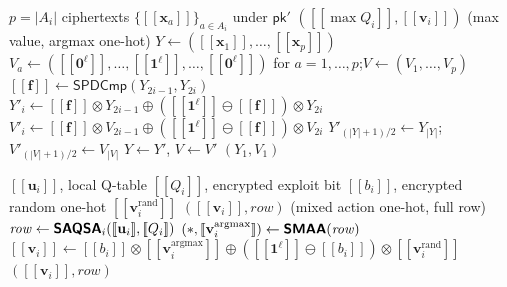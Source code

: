 \documentclass[letterpaper,10pt]{article}
\newcommand{\textbt}[1]{\textsf{\textbf{#1}}}
\theoremstyle{remark}
\newcommand{\impc}{\textsf{SPDCmp}\xspace}
\newcommand{\En}[1]{[\![#1]\!]}
\begin{document}
\begin{algorithm}[t]
\caption{\textbt{SMAA}: Secure Max and Argmax}
\label{alg:smaa}
\small
\begin{algorithmic}[1]
\Require $p=|A_i|$ ciphertexts $\{\En{\mathbf{x}_a}\}_{a\in A_i}$ under
$\mathsf{pk}'$
\Ensure $(\En{\max Q_i}, \En{\mathbf{v}_i})$ (max value, argmax one-hot)
\State $Y \leftarrow (\En{\mathbf{x}_1},\ldots,\En{\mathbf{x}_p})$
\State $V_a \leftarrow
(\En{\mathbf{0}^\ell},\ldots,\En{\mathbf{1}^\ell},\ldots,\En{\mathbf{0}^\ell})$
for $a=1,\ldots,p$;\quad $V\leftarrow(V_1,\ldots,V_p)$
\Repeat
    \State $\En{\mathbf{f}} \leftarrow \impc(Y_{2i-1}, Y_{2i})$
    \State $Y'_i \leftarrow \En{\mathbf{f}} \otimes Y_{2i-1}
    \oplus (\En{\mathbf{1}^\ell} \ominus \En{\mathbf{f}}) \otimes Y_{2i}$
    \State $V'_i \leftarrow \En{\mathbf{f}} \otimes V_{2i-1}
    \oplus (\En{\mathbf{1}^\ell} \ominus \En{\mathbf{f}}) \otimes V_{2i}$
  \EndFor
    \State $Y'_{(|Y|+1)/2} \leftarrow Y_{|Y|}$;
    $V'_{(|V|+1)/2} \leftarrow V_{|V|}$
  \EndIf
  \State $Y \leftarrow Y'$, $V \leftarrow V'$
\State \Return $(Y_1, V_1)$
\end{algorithmic}
\end{algorithm}

\begin{algorithm}[t]
\caption{\textbt{SPASA}: Secure $\epsilon$-greedy Action Selector}
\label{alg:spasa}
\small
\begin{algorithmic}[1]
\Require $\En{\mathbf{u}_i}$, local Q-table $\En{Q_i}$,
encrypted exploit bit $\En{b_i}$, encrypted random one-hot
$\En{\mathbf{v}^{\mathrm{rand}}_i}$
\Ensure $(\En{\mathbf{v}_i}, \mathit{row})$ (mixed action one-hot, full row)
\State $\mathit{row} \gets \textbt{SAQSA}_i(\En{\mathbf{u}_i}, \En{Q_i})$
  \Comment{step 2: fetch row $\{\En{Q_i(o_i,a)}\}_a$}
\State $(*, \En{\mathbf{v}^{\mathrm{argmax}}_i}) \gets
  \textbt{SMAA}(\mathit{row})$
\State $\En{\mathbf{v}_i} \gets
  \En{b_i} \otimes \En{\mathbf{v}^{\mathrm{argmax}}_i}
  \oplus (\En{\mathbf{1}^\ell} \ominus \En{b_i})
  \otimes \En{\mathbf{v}^{\mathrm{rand}}_i}$
\State \Return $(\En{\mathbf{v}_i}, \mathit{row})$
\end{algorithmic}
\end{algorithm}
\end{document}
